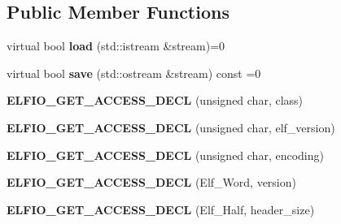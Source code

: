 \subsection*{Public Member Functions}
\begin{DoxyCompactItemize}
\item 
virtual bool {\bfseries load} (std\+::istream \&stream)=0\hypertarget{class_e_l_f_i_o_1_1elf__header_ab4d46f817a381c214901d83e20e8f105}{}\label{class_e_l_f_i_o_1_1elf__header_ab4d46f817a381c214901d83e20e8f105}

\item 
virtual bool {\bfseries save} (std\+::ostream \&stream) const =0\hypertarget{class_e_l_f_i_o_1_1elf__header_a4ddc14a74b4d2e919ba300f88ea90af6}{}\label{class_e_l_f_i_o_1_1elf__header_a4ddc14a74b4d2e919ba300f88ea90af6}

\item 
{\bfseries E\+L\+F\+I\+O\+\_\+\+G\+E\+T\+\_\+\+A\+C\+C\+E\+S\+S\+\_\+\+D\+E\+CL} (unsigned char, class)\hypertarget{class_e_l_f_i_o_1_1elf__header_adce7e1366bd9400318ade778f6ad26c4}{}\label{class_e_l_f_i_o_1_1elf__header_adce7e1366bd9400318ade778f6ad26c4}

\item 
{\bfseries E\+L\+F\+I\+O\+\_\+\+G\+E\+T\+\_\+\+A\+C\+C\+E\+S\+S\+\_\+\+D\+E\+CL} (unsigned char, elf\+\_\+version)\hypertarget{class_e_l_f_i_o_1_1elf__header_a56f22ab07bfcf305cc9c07e51d2fef82}{}\label{class_e_l_f_i_o_1_1elf__header_a56f22ab07bfcf305cc9c07e51d2fef82}

\item 
{\bfseries E\+L\+F\+I\+O\+\_\+\+G\+E\+T\+\_\+\+A\+C\+C\+E\+S\+S\+\_\+\+D\+E\+CL} (unsigned char, encoding)\hypertarget{class_e_l_f_i_o_1_1elf__header_a8dff580e4e0c0a54c75c08711a0b7ef0}{}\label{class_e_l_f_i_o_1_1elf__header_a8dff580e4e0c0a54c75c08711a0b7ef0}

\item 
{\bfseries E\+L\+F\+I\+O\+\_\+\+G\+E\+T\+\_\+\+A\+C\+C\+E\+S\+S\+\_\+\+D\+E\+CL} (Elf\+\_\+\+Word, version)\hypertarget{class_e_l_f_i_o_1_1elf__header_a3f317ed2516b5357203a78cf050a2739}{}\label{class_e_l_f_i_o_1_1elf__header_a3f317ed2516b5357203a78cf050a2739}

\item 
{\bfseries E\+L\+F\+I\+O\+\_\+\+G\+E\+T\+\_\+\+A\+C\+C\+E\+S\+S\+\_\+\+D\+E\+CL} (Elf\+\_\+\+Half, header\+\_\+size)\hypertarget{class_e_l_f_i_o_1_1elf__header_a9a99ed072d5c453885515b6b66cd589a}{}\label{class_e_l_f_i_o_1_1elf__header_a9a99ed072d5c453885515b6b66cd589a}


\end{DoxyCompactItemize}
